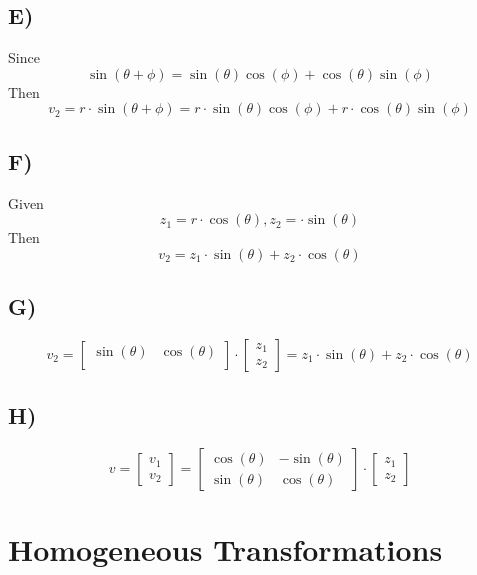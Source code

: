 \documentclass{article}
\begin{document}
\subsection*{E)}
Since
$$
	\sin(\theta + \phi) = \sin(\theta) \cos(\phi) + \cos(\theta) \sin(\phi)
$$
Then
$$
	v_2 = r \cdot \sin(\theta + \phi) = r \cdot \sin(\theta) \cos(\phi) + r \cdot \cos(\theta) \sin(\phi)
$$

\subsection*{F)}
Given
\[
	z_1 = r \cdot \cos(\theta) ,
	z_2 = \cdot \sin(\theta)
\]
Then
\[
	v_2 = z_1 \cdot \sin(\theta) + z_2 \cdot \cos(\theta)
\]
\subsection*{G)}

\[
	v_2 = \begin{bmatrix}
		\sin(\theta) & \cos(\theta) \\
	\end{bmatrix}
	\cdot
	\begin{bmatrix}
		z_1 \\
		z_2
	\end{bmatrix}
	=
	z_1 \cdot \sin(\theta) + z_2 \cdot \cos(\theta)
\]

\subsection*{H)}

\[
	v = \begin{bmatrix}
		v_1 \\
		v_2
	\end{bmatrix}
	=
	\begin{bmatrix}
		\cos(\theta) & - \sin(\theta) \\
		\sin(\theta) & \cos(\theta)
	\end{bmatrix}
	\cdot
	\begin{bmatrix}
		z_1 \\
		z_2
	\end{bmatrix}
\]

\section{Homogeneous Transformations}
\end{document}
